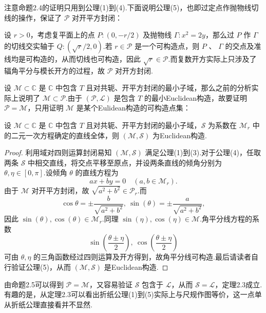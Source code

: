 注意命题2.4的证明只用到公理(1)到(4).下面说明公理(5)，也即过定点作抛物线切线的操作，保证了 $\mathcal{P}$ 对开平方封闭：

设 $r>0$，考虑复平面上的点 $P:(0,-r/2)$ 及抛物线 $\Gamma:x^2=2y$，那么过 $P$ 作 $\Gamma$ 的切线交实轴于 $Q:(\sqrt{r}/2,0)$.若 $r\in\mathcal{P}$ 是一个可构造点，则 $P$ 、 $\Gamma$ 的交点及准线均是可构造的，从而切线也可构造，因此 $\sqrt{r}\in\mathcal{P}$.而复数开方实际上只涉及了辐角平分与模长开方的过程，故 $\mathcal{P}$ 对开方封闭.

设 $\mathcal{M}\subset\mathbb{C}$ 是 $\mathbb{C}$ 中包含 $T$ 且对共轭、开平方封闭的最小子域，那么之前的分析实际上说明了 $\mathcal{M}\subset\mathcal{P}$.由于 $(\mathcal{P},\mathcal{L})$ 是包含 $T$ 的最小Euclidean构造，故要证明 $\mathcal{P}=\mathcal{M}$，只用证明 $\mathcal{M}$ 是某个Eulidean构造的可构造点集：

\begin{proposition}
    设 $\mathcal{M}\subset\mathbb{C}$ 是 $\mathbb{C}$ 中包含 $T$ 且对共轭、开平方封闭的最小子域，$\mathcal{S}$ 为系数在 $\mathcal{M}_r$ 中的二元一次方程确定的直线全体，则 $(\mathcal{M},\mathcal{S})$ 为Euclidean构造.
\end{proposition}

\begin{proof}
    利用域对四则运算封闭易知 $(\mathcal{M},\mathcal{S})$ 满足公理(1)到(3).对于公理(4)，任取两条 $\mathcal{S}$ 中相交直线，将交点平移至原点，并设两条直线的倾角分别为 $\theta,\eta\in[0,\pi]$.设倾角 $\theta$ 的直线方程为
    $$
    ax+by=0\quad (a,b\in\mathcal{M}_r).
    $$
    由于 $\mathcal{M}$ 对开平方封闭，故 $\sqrt{a^2+b^2}\in\mathcal{P}_r$.而
    $$
    \cos{\theta}=\pm\frac{b}{\sqrt{a^2+b^2}},\ \sin(\theta)=\pm\frac{a}{\sqrt{a^2+b^2}},
    $$
    因此 $\sin(\theta),\cos(\theta)\in\mathcal{M}_r$.同理 $\sin(\eta),\cos(\eta)\in\mathcal{M}$.角平分线方程的系数
    $$
    \sin(\frac{\theta\pm\eta}{2}),\ \cos(\frac{\theta\pm\eta}{2})
    $$
    可由 $\theta,\eta$ 的三角函数经过四则运算及开方得到，故角平分线可构造.最后请读者自行验证公理(5)，从而 $(\mathcal{M},\mathcal{S})$ 是Euclidean构造.
\end{proof}

由命题2.5可以得到 $\mathcal{P}=\mathcal{M}$，又容易验证 $\mathcal{S}$ 包含于 $\mathcal{L}$，从而 $\mathcal{S}=\mathcal{L}$，定理2.3成立.有趣的是，从定理2.3可以看出折纸公理(1)到(5)实际上与尺规作图等价，这一点单从折纸公理直接看并不显然.
